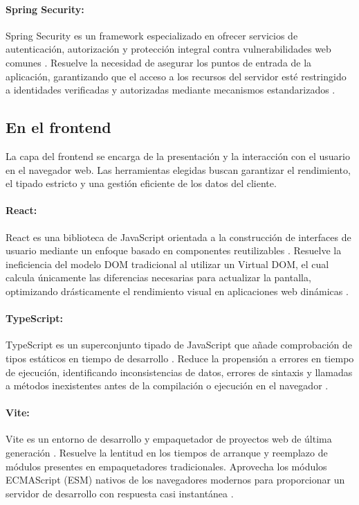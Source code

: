 	\paragraph{Spring Security:} Spring Security es un framework especializado en ofrecer servicios de autenticaci\'on, autorizaci\'on y protecci\'on integral contra vulnerabilidades web comunes \cite{spring-security}. Resuelve la necesidad de asegurar los puntos de entrada de la aplicaci\'on, garantizando que el acceso a los recursos del servidor est\'e restringido a identidades verificadas y autorizadas mediante mecanismos estandarizados \cite{spring-security}.
	
	\newpage

	\subsection{En el frontend} 
	La capa del frontend se encarga de la presentaci\'on y la interacci\'on con el usuario en el navegador web. Las herramientas elegidas buscan garantizar el rendimiento, el tipado estricto y una gesti\'on eficiente de los datos del cliente.
	
	\paragraph{React:} React es una biblioteca de JavaScript orientada a la construcci\'on de interfaces de usuario mediante un enfoque basado en componentes reutilizables \cite{react-docs}. Resuelve la ineficiencia del modelo DOM tradicional al utilizar un Virtual DOM, el cual calcula \'unicamente las diferencias necesarias para actualizar la pantalla, optimizando dr\'asticamente el rendimiento visual en aplicaciones web din\'amicas \cite{react-docs}.
	
	\paragraph{TypeScript:} TypeScript es un superconjunto tipado de JavaScript que añade comprobaci\'on de tipos est\'aticos en tiempo de desarrollo \cite{typescript-docs}. Reduce la propensi\'on a errores en tiempo de ejecuci\'on, identificando inconsistencias de datos, errores de sintaxis y llamadas a m\'etodos inexistentes antes de la compilaci\'on o ejecuci\'on en el navegador \cite{typescript-docs}.
	
	\paragraph{Vite:} Vite es un entorno de desarrollo y empaquetador de proyectos web de \'ultima generaci\'on \cite{vite-docs}. Resuelve la lentitud en los tiempos de arranque y reemplazo de m\'odulos presentes en empaquetadores tradicionales. Aprovecha los m\'odulos ECMAScript (ESM) nativos de los navegadores modernos para proporcionar un servidor de desarrollo con respuesta casi instant\'anea \cite{vite-docs}.
	

